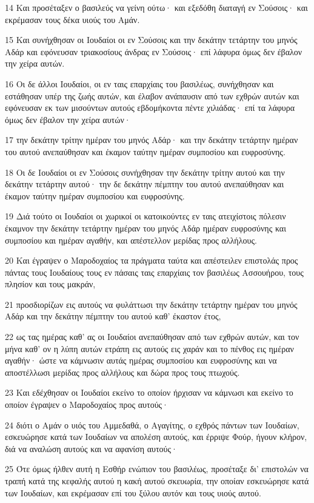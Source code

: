 \par 14 Και προσέταξεν ο βασιλεύς να γείνη ούτω· και εξεδόθη διαταγή εν Σούσοις· και εκρέμασαν τους δέκα υιούς του Αμάν.
\par 15 Και συνήχθησαν οι Ιουδαίοι οι εν Σούσοις και την δεκάτην τετάρτην του μηνός Αδάρ και εφόνευσαν τριακοσίους άνδρας εν Σούσοις· επί λάφυρα όμως δεν έβαλον την χείρα αυτών.
\par 16 Οι δε άλλοι Ιουδαίοι, οι εν ταις επαρχίαις του βασιλέως, συνήχθησαν και εστάθησαν υπέρ της ζωής αυτών, και έλαβον ανάπαυσιν από των εχθρών αυτών και εφόνευσαν εκ των μισούντων αυτούς εβδομήκοντα πέντε χιλιάδας· επί τα λάφυρα όμως δεν έβαλον την χείρα αυτών·
\par 17 την δεκάτην τρίτην ημέραν του μηνός Αδάρ· και την δεκάτην τετάρτην ημέραν του αυτού ανεπαύθησαν και έκαμον ταύτην ημέραν συμποσίου και ευφροσύνης.
\par 18 Οι δε Ιουδαίοι οι εν Σούσοις συνήχθησαν την δεκάτην τρίτην αυτού και την δεκάτην τετάρτην αυτού· την δε δεκάτην πέμπτην του αυτού ανεπαύθησαν και έκαμον ταύτην ημέραν συμποσίου και ευφροσύνης.
\par 19 Διά τούτο οι Ιουδαίοι οι χωρικοί οι κατοικούντες εν ταις ατειχίστοις πόλεσιν έκαμνον την δεκάτην τετάρτην ημέραν του μηνός Αδάρ ημέραν ευφροσύνης και συμποσίου και ημέραν αγαθήν, και απέστελλον μερίδας προς αλλήλους.
\par 20 Και έγραψεν ο Μαροδοχαίος τα πράγματα ταύτα και απέστειλεν επιστολάς προς πάντας τους Ιουδαίους τους εν πάσαις ταις επαρχίαις τον βασιλέως Ασσουήρου, τους πλησίον και τους μακράν,
\par 21 προσδιορίζων εις αυτούς να φυλάττωσι την δεκάτην τετάρτην ημέραν του μηνός Αδάρ και την δεκάτην πέμπτην του αυτού καθ' έκαστον έτος,
\par 22 ως τας ημέρας καθ' ας οι Ιουδαίοι ανεπαύθησαν από των εχθρών αυτών, και τον μήνα καθ' ον η λύπη αυτών ετράπη εις αυτούς εις χαράν και το πένθος εις ημέραν αγαθήν· ώστε να κάμνωσιν αυτάς ημέρας συμποσίου και ευφροσύνης και να αποστέλλωσι μερίδας προς αλλήλους και δώρα προς τους πτωχούς.
\par 23 Και εδέχθησαν οι Ιουδαίοι εκείνο το οποίον ήρχισαν να κάμνωσι και εκείνο το οποίον έγραψεν ο Μαροδοχαίος προς αυτούς·
\par 24 διότι ο Αμάν ο υιός του Αμμεδαθά, ο Αγαγίτης, ο εχθρός πάντων των Ιουδαίων, εσκευώρησε κατά των Ιουδαίων να απολέση αυτούς, και έρριψε Φούρ, ήγουν κλήρον, διά να αναλώση αυτούς και να αφανίση αυτούς·
\par 25 Ότε όμως ήλθεν αυτή η Εσθήρ ενώπιον του βασιλέως, προσέταξε δι' επιστολών να τραπή κατά της κεφαλής αυτού η κακή αυτού σκευωρία, την οποίαν εσκευώρησε κατά των Ιουδαίων, και εκρέμασαν επί του ξύλου αυτόν και τους υιούς αυτού.
